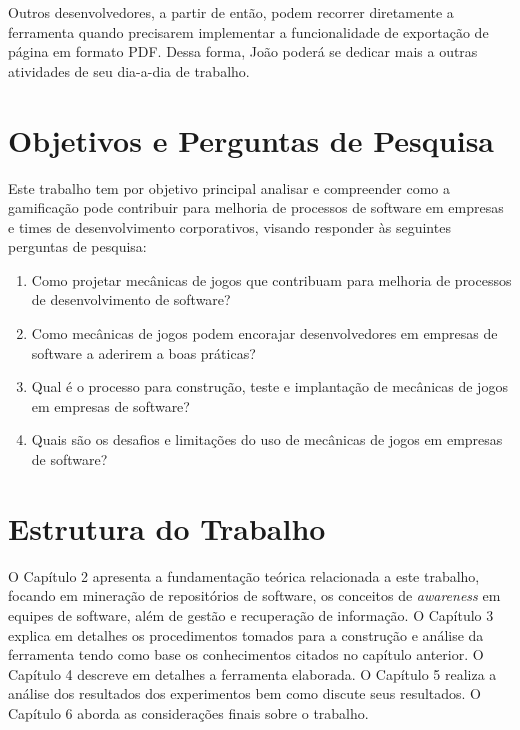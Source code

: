 Outros desenvolvedores, a partir de então, podem recorrer diretamente a ferramenta quando precisarem implementar a funcionalidade de exportação de página em formato PDF. Dessa forma, João poderá se dedicar mais a outras atividades de seu dia-a-dia de trabalho.

\section{Objetivos e Perguntas de Pesquisa}

Este trabalho tem por objetivo principal analisar e compreender como a gamificação pode contribuir para melhoria de processos de software em empresas e times de desenvolvimento corporativos, visando responder às seguintes perguntas de pesquisa:

\begin{enumerate}
  \item Como projetar mecânicas de jogos que contribuam para melhoria de processos de desenvolvimento de software?
  \item Como mecânicas de jogos podem encorajar desenvolvedores em empresas de software a aderirem a boas práticas?
  \item Qual é o processo para construção, teste e implantação de mecânicas de jogos em empresas de software?
  \item Quais são os desafios e limitações do uso de mecânicas de jogos em empresas de software?
\end{enumerate}

\section{Estrutura do Trabalho}

O Capítulo 2 apresenta a fundamentação teórica relacionada a este trabalho, focando em mineração de repositórios de software, os conceitos de \textit{awareness} em equipes de software, além de gestão e recuperação de informação. O Capítulo 3 explica em detalhes os procedimentos tomados para a construção e análise da ferramenta tendo como base os conhecimentos citados no capítulo anterior. O Capítulo 4 descreve em detalhes a ferramenta elaborada. O Capítulo 5 realiza a análise dos resultados dos experimentos bem como discute seus resultados. O Capítulo 6 aborda as considerações finais sobre o trabalho.
